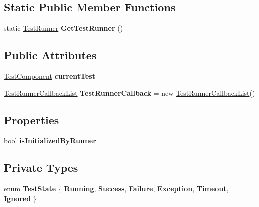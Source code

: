 \subsection*{Static Public Member Functions}
\begin{DoxyCompactItemize}
\item 
\mbox{\label{class_unity_test_1_1_test_runner_ac12b3855acc4f29c8fb68d459da169af}} 
static \hyperlink{class_unity_test_1_1_test_runner}{Test\+Runner} {\bfseries Get\+Test\+Runner} ()
\end{DoxyCompactItemize}
\subsection*{Public Attributes}
\begin{DoxyCompactItemize}
\item 
\mbox{\label{class_unity_test_1_1_test_runner_ac21c989bc2f629bfba638f4f37b629fc}} 
\hyperlink{class_unity_test_1_1_test_component}{Test\+Component} {\bfseries current\+Test}
\item 
\mbox{\label{class_unity_test_1_1_test_runner_a6eecc30d5caeed6ddda79286538003ce}} 
\hyperlink{class_unity_test_1_1_integration_test_runner_1_1_test_runner_callback_list}{Test\+Runner\+Callback\+List} {\bfseries Test\+Runner\+Callback} = new \hyperlink{class_unity_test_1_1_integration_test_runner_1_1_test_runner_callback_list}{Test\+Runner\+Callback\+List}()
\end{DoxyCompactItemize}
\subsection*{Properties}
\begin{DoxyCompactItemize}
\item 
\mbox{\label{class_unity_test_1_1_test_runner_a8de3376e2ec0fb79add2203cf4ccf89a}} 
bool {\bfseries is\+Initialized\+By\+Runner}
\end{DoxyCompactItemize}
\subsection*{Private Types}
\begin{DoxyCompactItemize}
\item 
\mbox{\label{class_unity_test_1_1_test_runner_abdd475451c0d369dc513578fa77c4945}} 
enum {\bfseries Test\+State} \{ \newline
{\bfseries Running}, 
{\bfseries Success}, 
{\bfseries Failure}, 
{\bfseries Exception}, 
\newline
{\bfseries Timeout}, 
{\bfseries Ignored}
 \}
\end{DoxyCompactItemize}
